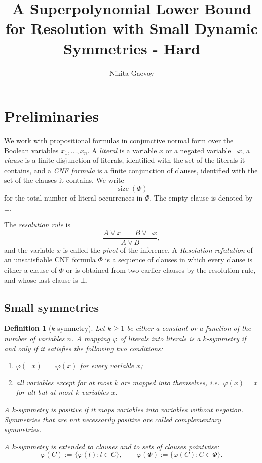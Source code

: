 \documentclass[10pt]{article}
\title{A Superpolynomial Lower Bound for Resolution with Small Dynamic Symmetries - Hard}
\author{Nikita Gaevoy}
\date{}
\newtheorem{definition}{Definition}
\begin{document}
\maketitle

\section{Preliminaries}

We work with propositional formulas in conjunctive normal form over the
Boolean variables $x_1,\ldots,x_n$. A \emph{literal} is a variable $x$ or a
negated variable $\lnot x$, a \emph{clause} is a finite disjunction of
literals, identified with the set of the literals it contains, and a
\emph{CNF formula} is a finite conjunction of clauses, identified with the
set of the clauses it contains. We write
\[
\operatorname{size}(\Phi)
\]
for the total number of literal occurrences in $\Phi$. The empty clause is
denoted by $\bot$.

The \emph{resolution rule} is
\[
\frac{
A\lor x
\qquad
B\lor\lnot x
}{
A\lor B
},
\]
and the variable $x$ is called the \emph{pivot} of the inference. A
\emph{Resolution refutation} of an unsatisfiable CNF formula $\Phi$ is a
sequence of clauses in which every clause is either a clause of $\Phi$ or is
obtained from two earlier clauses by the resolution rule, and whose last
clause is $\bot$.

\subsection{Small symmetries}

\begin{definition}[$k$-symmetry]\label{def:ksym}
Let $k\ge 1$ be either a constant or a function of the number of variables
$n$. A mapping $\varphi$ of literals into literals is a \emph{$k$-symmetry} if
and only if it satisfies the following two conditions:
\begin{enumerate}
    \item $\varphi(\lnot x)=\lnot\varphi(x)$ for every variable $x$;
    \item all variables except for at most $k$ are mapped into themselves,
    i.e.\ $\varphi(x)=x$ for all but at most $k$ variables $x$.
\end{enumerate}
A $k$-symmetry is \emph{positive} if it maps variables into variables without
negation. Symmetries that are not necessarily positive are called
\emph{complementary} symmetries.

A $k$-symmetry is extended to clauses and to sets of clauses pointwise:
\[
\varphi(C):=\{\varphi(l):l\in C\},
\qquad
\varphi(\Phi):=\{\varphi(C):C\in\Phi\}.
\]
\end{definition}
\end{document}
